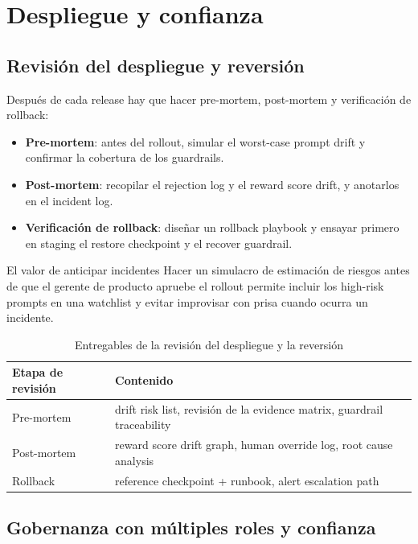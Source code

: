 \section{Despliegue y confianza}

\subsection{Revisión del despliegue y reversión}

Después de cada release hay que hacer pre-mortem, post-mortem y verificación de rollback:
\begin{itemize}
    \item \textbf{Pre-mortem}: antes del rollout, simular el worst-case prompt drift y confirmar la cobertura de los guardrails.
    \item \textbf{Post-mortem}: recopilar el rejection log y el reward score drift, y anotarlos en el incident log.
    \item \textbf{Verificación de rollback}: diseñar un rollback playbook y ensayar primero en staging el restore checkpoint y el recover guardrail.
\end{itemize}

\begin{importantbox}{El valor de anticipar incidentes}
Hacer un simulacro de estimación de riesgos antes de que el gerente de producto apruebe el rollout permite incluir los high-risk prompts en una watchlist y evitar improvisar con prisa cuando ocurra un incidente.
\end{importantbox}

\begin{table}[H]
\centering
\begin{tabular}{p{} p{}}
\toprule
Etapa de revisión & Contenido \\
\midrule
Pre-mortem & drift risk list, revisión de la evidence matrix, guardrail traceability \\
Post-mortem & reward score drift graph, human override log, root cause analysis \\
Rollback & reference checkpoint + runbook, alert escalation path \\
\bottomrule
\end{tabular}
\caption{Entregables de la revisión del despliegue y la reversión}
\end{table}

\subsection{Gobernanza con múltiples roles y confianza}

